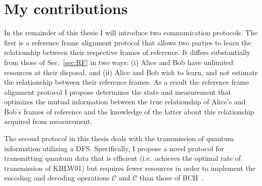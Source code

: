 \section{\label{Goals}My contributions}

In the remainder of this thesis I will introduce two communication protocols. The first is a reference frame alignment protocol that allows two parties to learn the relationship between their respective frames of reference.  It differs substantially from those of Sec.~\ref{sec:RF} in two ways: (i) Alice and Bob have unlimited resources at their disposal, and (ii) Alice and Bob wish to learn, and not estimate the relationship between their reference frames.  As a result the reference frame alignment protocol I propose determines the state and measurement that optimizes the mutual information between the true relationship of Alice's and Bob's frames of reference and the knowledge of the latter about this relationship acquired from measurement.  

The second protocol in this thesis deals with the transmission of quantum information utilizing a DFS.  Specifically, I propose a novel protocol for transmitting quantum data that is efficient (i.e.~achieves the optimal rate of transmission of KBLW01) but requires fewer resources in order to implement the encoding and decoding operations $\mathcal{C}$ and $\mathcal{C}$ than those of BCH~\cite{BCH06a, BCH06b}.  

